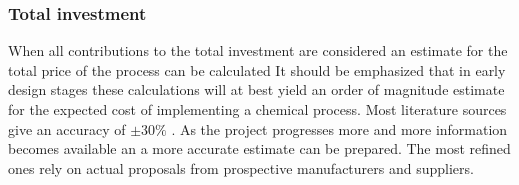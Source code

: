     \subsubsection{Total investment}
        When all contributions to the total investment are considered an estimate for the total price of the
        process can be calculated
        It should be emphasized that in early design stages these calculations will at best yield an order of
        magnitude estimate for the expected cost of implementing a chemical process. Most literature sources
        give an accuracy of $\pm 30 \%$  \cite{Peters.2003}. As the project progresses more and more information
        becomes available an a more accurate estimate can be prepared. The most refined ones rely on actual
        proposals from prospective manufacturers and suppliers.
